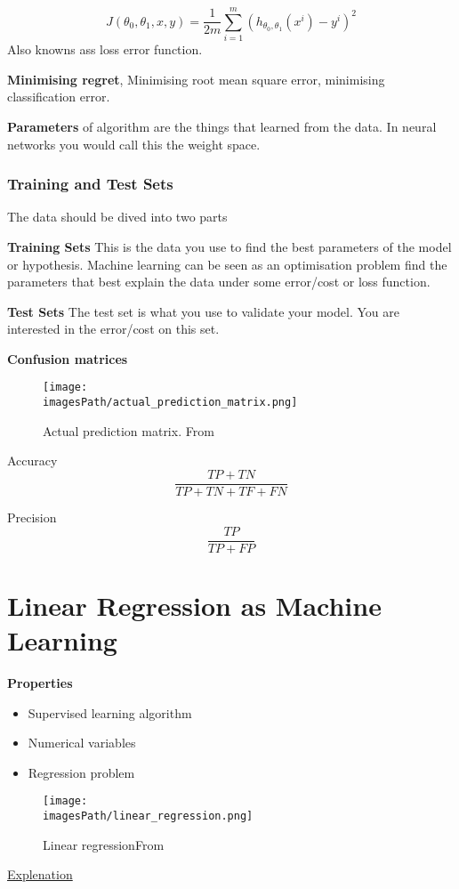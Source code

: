 \begin{equation*}
    J(\theta_0,\theta_1,x,y) = \frac{1}{2m}\sum_{i=1}^{m}(h_{\theta_0,\theta_1}(x^i)-y^i)^2
\end{equation*}
Also knowns ass loss error function.

\textbf{Minimising regret}, Minimising root mean square error, minimising
classification error.

\textbf{Parameters} of algorithm are the things that learned from the data. In
neural networks you would call this the weight space. 

\subsubsection{Training and Test Sets}
The data should be dived into two parts 

\textbf{Training Sets} This is the data you use to find the best parameters of the
model or hypothesis. Machine learning can be seen as an
optimisation problem find the parameters that best explain
the data under some error/cost or loss function.

\textbf{Test Sets} The test set is what you use to validate your model. You are
interested in the error/cost on this set.

\textbf{Confusion matrices}
\begin{figure}[!h]
    \centering
    \texttt{[image: \\imagesPath/actual\_prediction\_matrix.png]}
    \caption{Actual prediction matrix. From \cite{}}
\end{figure}

Accuracy 
\begin{equation*}
    \frac{TP+TN}{TP+TN+TF+FN}
\end{equation*}

Precision 
\begin{equation*}
    \frac{TP}{TP+FP}
\end{equation*}

\newpage
\section{Linear Regression as Machine Learning}
\textbf{Properties}
\begin{itemize}
    \item Supervised learning algorithm
    \item Numerical variables 
    \item Regression problem
\end{itemize}
\begin{figure}[!h]
    \centering
    \texttt{[image: \\imagesPath/linear\_regression.png]}
    \caption{Linear regressionFrom \cite{}}
\end{figure}
\href{https://www.youtube.com/watch?v=nk2CQITm_eo}{Explenation}


